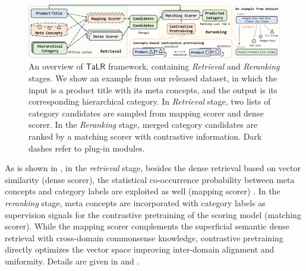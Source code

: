 \begin{figure}[th] \centering
    \includegraphics[width=\textwidth]{pipeline}
    \caption{An overview of $\mathsf{TaLR}$ framework, containing \textit{Retrieval} and \textit{Reranking} stages. We show an example from our released dataset, in which the input is a product title with its meta concepts, and the output is its corresponding hierarchical category. In \textit{Retrieval} stage, two lists of category candidates are sampled from mapping scorer and dense scorer. In the \textit{Reranking} stage, merged category candidates are ranked by a matching scorer with contrastive information. Dark dashes refer to plug-in modules. }
    \label{fig:pipeline}
\end{figure}
As is shown in , in the \textit{retrieval} stage, besides the dense 
retrieval based on 
vector similarity (dense scorer), the statistical co-occurrence probability between meta concepts and 
category labels are exploited as well (mapping scorer) . 
In the \textit{reranking} stage, meta concepts are incorporated with 
category labels as supervision signals for the contrastive pretraining 
of the scoring model (matching scorer). 
While the mapping scorer complements the superficial semantic dense retrieval with cross-domain commonsense knowledge, contrastive pretraining directly optimizes the vector space improving inter-domain alignment and uniformity. Details are given in  and .

